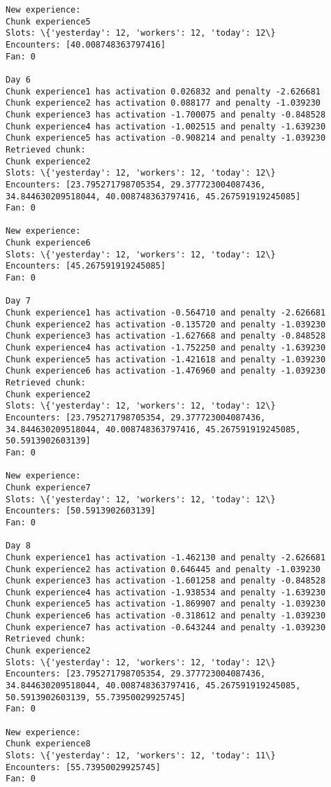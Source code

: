 \documentclass[11pt]{article}
\begin{document}
\begin{Verbatim}[commandchars=\\\{\}]
New experience:
Chunk experience5
Slots: \{'yesterday': 12, 'workers': 12, 'today': 12\}
Encounters: [40.008748363797416]
Fan: 0

Day 6
Chunk experience1 has activation 0.026832 and penalty -2.626681
Chunk experience2 has activation 0.088177 and penalty -1.039230
Chunk experience3 has activation -1.700075 and penalty -0.848528
Chunk experience4 has activation -1.002515 and penalty -1.639230
Chunk experience5 has activation -0.908214 and penalty -1.039230
Retrieved chunk:
Chunk experience2
Slots: \{'yesterday': 12, 'workers': 12, 'today': 12\}
Encounters: [23.795271798705354, 29.377723004087436, 34.844630209518044, 40.008748363797416, 45.267591919245085]
Fan: 0

New experience:
Chunk experience6
Slots: \{'yesterday': 12, 'workers': 12, 'today': 12\}
Encounters: [45.267591919245085]
Fan: 0

Day 7
Chunk experience1 has activation -0.564710 and penalty -2.626681
Chunk experience2 has activation -0.135720 and penalty -1.039230
Chunk experience3 has activation -1.627668 and penalty -0.848528
Chunk experience4 has activation -1.752250 and penalty -1.639230
Chunk experience5 has activation -1.421618 and penalty -1.039230
Chunk experience6 has activation -1.476960 and penalty -1.039230
Retrieved chunk:
Chunk experience2
Slots: \{'yesterday': 12, 'workers': 12, 'today': 12\}
Encounters: [23.795271798705354, 29.377723004087436, 34.844630209518044, 40.008748363797416, 45.267591919245085, 50.5913902603139]
Fan: 0

New experience:
Chunk experience7
Slots: \{'yesterday': 12, 'workers': 12, 'today': 12\}
Encounters: [50.5913902603139]
Fan: 0

Day 8
Chunk experience1 has activation -1.462130 and penalty -2.626681
Chunk experience2 has activation 0.646445 and penalty -1.039230
Chunk experience3 has activation -1.601258 and penalty -0.848528
Chunk experience4 has activation -1.938534 and penalty -1.639230
Chunk experience5 has activation -1.869907 and penalty -1.039230
Chunk experience6 has activation -0.318612 and penalty -1.039230
Chunk experience7 has activation -0.643244 and penalty -1.039230
Retrieved chunk:
Chunk experience2
Slots: \{'yesterday': 12, 'workers': 12, 'today': 12\}
Encounters: [23.795271798705354, 29.377723004087436, 34.844630209518044, 40.008748363797416, 45.267591919245085, 50.5913902603139, 55.73950029925745]
Fan: 0

New experience:
Chunk experience8
Slots: \{'yesterday': 12, 'workers': 12, 'today': 11\}
Encounters: [55.73950029925745]
Fan: 0


\end{Verbatim}
\end{document}
